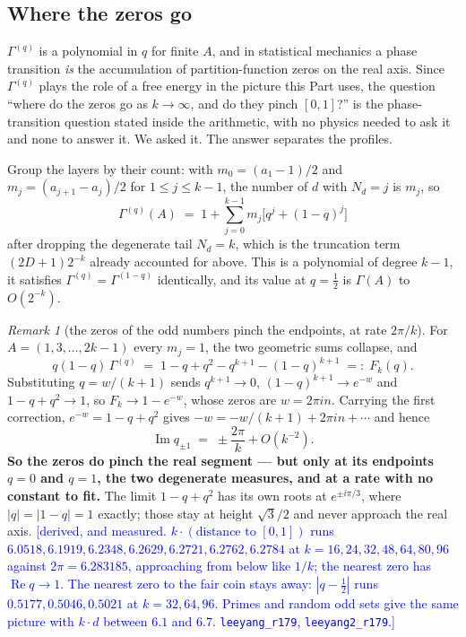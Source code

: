 \documentclass[11pt,a4paper]{article}
\theoremstyle{plain}
\theoremstyle{definition}
\theoremstyle{remark}
\newtheorem{remark}[theorem]{Remark}
\newcommand{\STATUS}[1]{\textcolor{blue}{\textsf{[#1]}}}
\begin{document}
\subsection{Where the zeros go}\label{sec:leeyang}

$\Gamma^{(q)}$ is a polynomial in $q$ for finite $A$, and in statistical mechanics a phase
transition \emph{is} the accumulation of partition-function zeros on the real axis. Since
$\Gamma^{(q)}$ plays the role of a free energy in the picture this Part uses, the question
``where do the zeros go as $k\to\infty$, and do they pinch $[0,1]$?'' is the phase-transition
question stated inside the arithmetic, with no physics needed to ask it and none to answer it.
We asked it. The answer separates the profiles.

Group the layers by their count: with $m_0=(a_1-1)/2$ and $m_j=(a_{j+1}-a_j)/2$ for
$1\le j\le k-1$, the number of $d$ with $N_d=j$ is $m_j$, so
\begin{equation}\label{eq:gqpoly}
  \Gamma^{(q)}(A)\;=\;1+\sum_{j=0}^{k-1}m_j\bigl[q^{j}+(1-q)^{j}\bigr]
\end{equation}
after dropping the degenerate tail $N_d=k$, which is the truncation term $(2D+1)2^{-k}$ already
accounted for above. This is a polynomial of degree $k-1$, it satisfies
$\Gamma^{(q)}=\Gamma^{(1-q)}$ identically, and its value at $q=\tfrac12$ is $\Gamma(A)$ to
$O(2^{-k})$.

\begin{remark}[the zeros of the odd numbers pinch the endpoints, at rate $2\pi/k$]\label{rem:leeyang}
For $A=(1,3,\dots,2k-1)$ every $m_j=1$, the two geometric sums collapse, and
\[
  q(1-q)\,\Gamma^{(q)}\;=\;1-q+q^{2}-q^{k+1}-(1-q)^{k+1}\;=:\;F_k(q).
\]
Substituting $q=w/(k+1)$ sends $q^{k+1}\to0$, $(1-q)^{k+1}\to e^{-w}$ and $1-q+q^{2}\to1$, so
$F_k\to1-e^{-w}$, whose zeros are $w=2\pi i n$. Carrying the first correction,
$e^{-w}=1-q+q^{2}$ gives $-w=-w/(k+1)+2\pi i n+\cdots$ and hence
\[
  \operatorname{Im}q_{\pm1}\;=\;\pm\frac{2\pi}{k}+O(k^{-2}).
\]
\textbf{So the zeros do pinch the real segment --- but only at its endpoints $q=0$ and $q=1$,
the two degenerate measures, and at a rate with no constant to fit.} The limit
$1-q+q^{2}$ has its own roots at $e^{\pm i\pi/3}$, where $|q|=|1-q|=1$ exactly; those stay at
height $\sqrt3/2$ and never approach the real axis.
\STATUS{derived, and measured. $k\cdot(\text{distance to }[0,1])$ runs
$6.0518,6.1919,6.2348,6.2629,6.2721,6.2762,6.2784$ at $k=16,24,32,48,64,80,96$ against
$2\pi=6.283185$, approaching from below like $1/k$; the nearest zero has
$\operatorname{Re}q\to1$. The nearest zero to the fair coin stays away: $|q-\tfrac12|$ runs
$0.5177,0.5046,0.5021$ at $k=32,64,96$. Primes and random odd sets give the same picture with
$k\cdot d$ between $6.1$ and $6.7$. \texttt{leeyang\_r179}, \texttt{leeyang2\_r179}.}
\end{remark}
\end{document}
